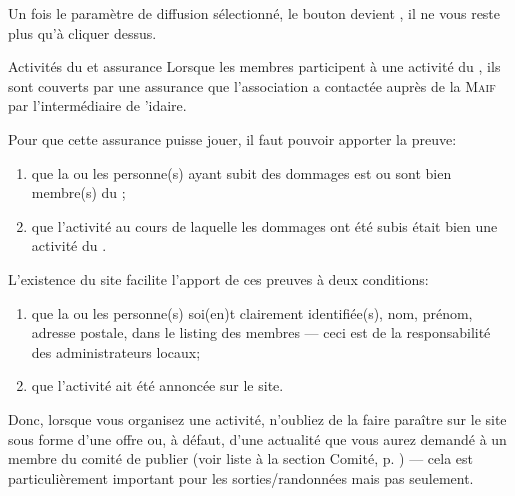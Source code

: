 Un fois le paramètre de diffusion sélectionné, le bouton  devient , il ne vous reste plus qu'à cliquer dessus.

\medskip

\begin{mybox}[colbacktitle=MidnightBlue]{Activités du \sel et assurance}
    Lorsque les membres participent à une activité du \CdS, ils sont couverts par une assurance que l'association a contactée auprès de la \textsc{Maif} par l'intermédiaire de \sel'idaire.
    
    Pour que cette assurance puisse jouer, il faut pouvoir apporter la preuve:
    \begin{enumerate}
        \item que la ou les personne(s) ayant subit des dommages est ou sont bien membre(s) du \CdS;
        \item que l'activité au cours de laquelle les dommages ont été subis était bien une activité du \CdS.
    \end{enumerate}
    L'existence du site \CF{} facilite l'apport de ces preuves à deux conditions:
    \begin{enumerate}
        \item que la ou les personne(s) soi(en)t clairement identifiée(s), nom, prénom, adresse postale, dans le listing des membres --- ceci est de la responsabilité des administrateurs locaux;
        \item que l'activité ait été annoncée sur le site.
    \end{enumerate} 
    Donc, lorsque vous organisez une activité, n'oubliez de la faire paraître sur le site sous forme d'une offre ou, à défaut,  d'une actualité que vous aurez demandé à un membre du comité de publier (voir liste à la section \og{}Comité\fg, p. \pageref{sec:comite}) --- cela est particulièrement important pour les sorties/randonnées mais pas seulement.  
    \end{mybox}
    

